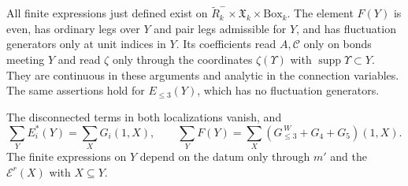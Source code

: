 \documentclass[11pt,letterpaper,reqno]{amsart}
\DeclareMathOperator{\supp}{supp}
\begin{document}
\begin{proposition}\label{prop:rgnl-finite-locality}
All finite expressions just defined exist on
$\widetilde R_k^-\times\mathfrak X_k\times\mathrm{Box}_k$.
The element $F(Y)$ is even, has ordinary legs over $Y$ and
pair legs admissible for $Y$, and has fluctuation generators
only at unit indices in $Y$. Its coefficients read $A,\mathscr C$
only on bonds meeting $Y$ and read $\zeta$ only through the
coordinates $\zeta(\Upsilon)$ with $\supp\Upsilon\subset Y$.
They are continuous in these arguments and analytic in the
connection variables. The same assertions hold for $E_{\le3}(Y)$,
which has no fluctuation generators.

The disconnected terms in both localizations vanish, and
\begin{equation}\label{eq:rgnl-two-localization-sums}
 \sum_YE_i^*(Y)=\sum_XG_i(1,X),\qquad
 \sum_YF(Y)=\sum_X(G_{\le3}^{\,W}+G_4+G_5)(1,X).
\end{equation}
The finite expressions on $Y$ depend on the datum only through
$m'$ and the $\mathscr E^r(X)$ with $X\subseteq Y$.
\end{proposition}
\end{document}
